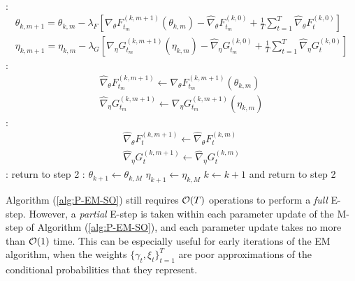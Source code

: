 \begin{algorithm}
\begin{algorithmic}[1]
\begin{gather}
        \end{gather}
    :
        \begin{gather}
            \theta_{k,m+1} = \theta_{k,m} - \lambda_F \left[\nabla_\theta F_{t_m}^{(k,m+1)}(\theta_{k,m}) - \widehat \nabla_\theta F_{t_m}^{(k,0)} + \frac{1}{T} \sum_{t=1}^T \widehat \nabla_\theta F^{(k,0)}_{t} \right] \\
            \eta_{k,m+1} = \eta_{k,m} - \lambda_G \left[\nabla_\eta G_{t_m}^{(k,m+1)}(\eta_{k,m}) - \widehat \nabla_\eta G_{t_m}^{(k,0)} + \frac{1}{T} \sum_{t=1}^T \widehat \nabla_\eta G^{(k,0)}_{t} \right]
        \end{gather}
    \EndIf
    :
        \begin{gather}
            \widehat \nabla_\theta F_{t_m}^{(k,m+1)} \leftarrow \nabla_\theta F_{t_m}^{(k,m+1)}(\theta_{k,m}) \\
            \widehat \nabla_\eta G_{t_m}^{(k,m+1)} \leftarrow \nabla_\eta G_{t_m}^{(k,m+1)}(\eta_{k,m})
        \end{gather}
        :
            \begin{gather}
                \widehat \nabla_\theta F_{t}^{(k,m+1)} \leftarrow \widehat \nabla_\theta F_{t}^{(k,m)} \\
                \widehat \nabla_\eta G_{t}^{(k,m+1)} \leftarrow \widehat \nabla_\eta G_{t}^{(k,m)}
            \end{gather}
        \EndFor
    \EndIf
\EndFor
%
:
    \State return to step 2 
\Else:
    \State $\theta_{k+1} \leftarrow \theta_{k,M}$
    \State $\eta_{k+1} \leftarrow \eta_{k,M}$
    \State $k \leftarrow k+1$ and return to step 2
\EndIf
\end{algorithmic}
\end{algorithm}

Algorithm (\ref{alg:P-EM-SO}) still requires $\mathcal{O}(T)$ operations to perform a \textit{full} E-step. However, a \textit{partial} E-step is taken within each parameter update of the M-step of Algorithm (\ref{alg:P-EM-SO}), and each parameter update takes no more than $\mathcal{O}(1)$ time. This can be especially useful for early iterations of the EM algorithm, when the weights $\{\gamma_t,\xi_t\}_{t=1}^T$ are poor approximations of the conditional probabilities that they represent.

